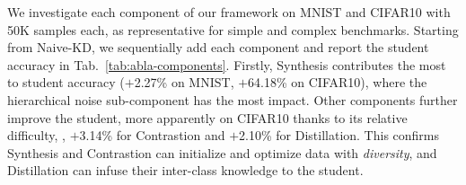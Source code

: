 \begin{foldable}
    We investigate each component of our framework {\methodname} on MNIST and CIFAR10 with 50K samples each, as representative for simple and complex benchmarks.
    Starting from Naive-KD, we sequentially add each component and report the student accuracy in Tab.~\ref{tab:abla-components}.
    Firstly, Synthesis contributes the most to student accuracy ($+$2.27\% on MNIST, $+$64.18\% on CIFAR10), where the hierarchical noise sub-component has the most impact.
    Other components further improve the student, more apparently on CIFAR10 thanks to its relative difficulty, \ie, $+$3.14\% for Contrastion and $+$2.10\% for Distillation.
    This confirms Synthesis and Contrastion can initialize and optimize data with \textit{diversity}, and Distillation can infuse their inter-class knowledge to the student.
\end{foldable}


